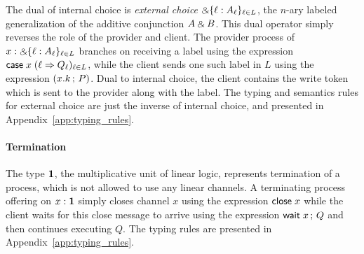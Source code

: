 The dual of internal choice is \emph{external choice} $\mathbin{\binampersand} \{ \ell :
A_\ell \}_{\ell \in L}$, the $n$-ary labeled generalization of the
additive conjunction $A \mathbin{\binampersand} B$. This dual operator simply reverses
the role of the provider and client. The provider process of
$x : \mathbin{\binampersand} \{ \ell : A_\ell \}_{\ell \in L}$ branches on receiving a label
using the expression $\mathsf{case} \; x \; (\ell \Rightarrow Q_\ell)_{\ell \in L}$,
while the client sends one such label in $L$ using the expression $(x.k \, ; \, P)$.
Dual to internal choice, the client contains the write token which is
sent to the provider along with the label.
The typing and semantics rules for external choice are just the inverse of internal choice,
and presented in Appendix~\ref{app:typing_rules}.

\paragraph*{\textbf{Termination}}
The type $\mathbf{1}$, the multiplicative unit of linear logic, represents
termination of a process, which is not allowed to use
any linear channels. A terminating process offering on $x : \mathbf{1}$ simply
closes channel $x$ using the expression $\mathsf{close} \; x$ while the client waits
for this close message to arrive using the expression $\mathsf{wait} \; x \, ; \, Q$
and then continues executing $Q$.
The typing rules are presented in Appendix~\ref{app:typing_rules}.

